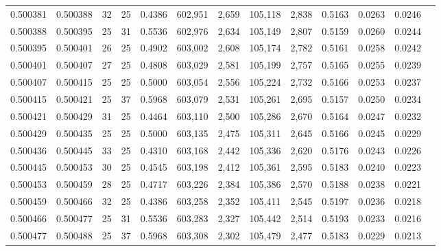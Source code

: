 \begin{tabular}{rrrrrrrrrrrrr}
0.500381 & 0.500388 &    32 &  25 &                                     0.4386 & 602,951 &   2,659 & 105,118 &   2,838 & 0.5163 & 0.0263 & 0.0246 \\
0.500388 & 0.500395 &    25 &  31 &                                     0.5536 & 602,976 &   2,634 & 105,149 &   2,807 & 0.5159 & 0.0260 & 0.0244 \\
0.500395 & 0.500401 &    26 &  25 &                                     0.4902 & 603,002 &   2,608 & 105,174 &   2,782 & 0.5161 & 0.0258 & 0.0242 \\
0.500401 & 0.500407 &    27 &  25 &                                     0.4808 & 603,029 &   2,581 & 105,199 &   2,757 & 0.5165 & 0.0255 & 0.0239 \\
0.500407 & 0.500415 &    25 &  25 &                                     0.5000 & 603,054 &   2,556 & 105,224 &   2,732 & 0.5166 & 0.0253 & 0.0237 \\
0.500415 & 0.500421 &    25 &  37 &                                     0.5968 & 603,079 &   2,531 & 105,261 &   2,695 & 0.5157 & 0.0250 & 0.0234 \\
0.500421 & 0.500429 &    31 &  25 &                                     0.4464 & 603,110 &   2,500 & 105,286 &   2,670 & 0.5164 & 0.0247 & 0.0232 \\
0.500429 & 0.500435 &    25 &  25 &                                     0.5000 & 603,135 &   2,475 & 105,311 &   2,645 & 0.5166 & 0.0245 & 0.0229 \\
0.500436 & 0.500445 &    33 &  25 &                                     0.4310 & 603,168 &   2,442 & 105,336 &   2,620 & 0.5176 & 0.0243 & 0.0226 \\
0.500445 & 0.500453 &    30 &  25 &                                     0.4545 & 603,198 &   2,412 & 105,361 &   2,595 & 0.5183 & 0.0240 & 0.0223 \\
0.500453 & 0.500459 &    28 &  25 &                                     0.4717 & 603,226 &   2,384 & 105,386 &   2,570 & 0.5188 & 0.0238 & 0.0221 \\
0.500459 & 0.500466 &    32 &  25 &                                     0.4386 & 603,258 &   2,352 & 105,411 &   2,545 & 0.5197 & 0.0236 & 0.0218 \\
0.500466 & 0.500477 &    25 &  31 &                                     0.5536 & 603,283 &   2,327 & 105,442 &   2,514 & 0.5193 & 0.0233 & 0.0216 \\
0.500477 & 0.500488 &    25 &  37 &                                     0.5968 & 603,308 &   2,302 & 105,479 &   2,477 & 0.5183 & 0.0229 & 0.0213 \\

\end{tabular}
